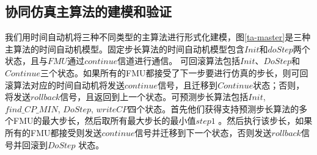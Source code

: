 \subsection{协同仿真主算法的建模和验证} 
\label{sec:ma}
我们用时间自动机将三种不同类型的主算法进行形式化建模，图\ref{ta-master}是三种主算法的时间自动机模型。固定步长算法的时间自动机模型包含$Init$和$doStep$两个状态，且与$FMU$通过$continue$信道进行通信。 可回滚算法包括$Init$、$DoStep$和$Continue$三个状态。如果所有的FMU都接受了下一步要进行仿真的步长，则可回滚算法对应的时间自动机将发送$continue$信号，且迁移到$Continue$状态；否则，将发送$rollback$信号，且返回到上一个状态。可预测步长算法包括$Init$, $find \_ CP \_ MIN$, $DoStep$, $writeCP$四个状态。首先他们获得支持预测步长算法的多个FMU的最大步长，然后取所有最大步长的最小值$step1$ 。然后执行该步长，如果所有的FMU都接受则发送$continue$信号并迁移到下一个状态，否则发送$rollback$信号并回滚到$DoStep$ 状态。
\begin{figure}[htbp]
\end{figure}

